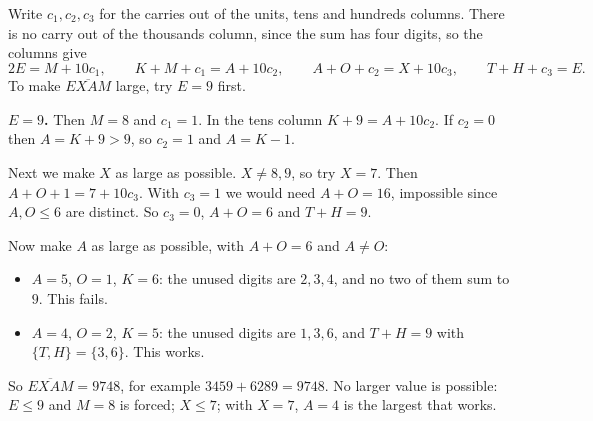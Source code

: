 Write $c_1,c_2,c_3$ for the carries out of the units, tens and hundreds columns. There is no carry out of the thousands column, since the sum has four digits, so the columns give
\[
2E=M+10c_1,\qquad K+M+c_1=A+10c_2,\qquad A+O+c_2=X+10c_3,\qquad T+H+c_3=E .
\]
To make $\overline{EXAM}$ large, try $E=9$ first.

\textbf{$E=9$.} Then $M=8$ and $c_1=1$. In the tens column $K+9=A+10c_2$. If $c_2=0$ then $A=K+9>9$, so $c_2=1$ and $A=K-1$.

Next we make $X$ as large as possible. $X\ne8,9$, so try $X=7$. Then $A+O+1=7+10c_3$. With $c_3=1$ we would need $A+O=16$, impossible since $A,O\le6$ are distinct. So $c_3=0$, $A+O=6$ and $T+H=9$.

Now make $A$ as large as possible, with $A+O=6$ and $A\ne O$:
\begin{itemize}
\item $A=5$, $O=1$, $K=6$: the unused digits are $2,3,4$, and no two of them sum to $9$. This fails.
\item $A=4$, $O=2$, $K=5$: the unused digits are $1,3,6$, and $T+H=9$ with $\{T,H\}=\{3,6\}$. This works.
\end{itemize}
So $\overline{EXAM}=\boxed{9748}$, for example $3459+6289=9748$. No larger value is possible: $E\le9$ and $M=8$ is forced; $X\le7$; with $X=7$, $A=4$ is the largest that works.
